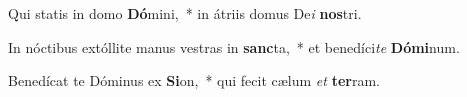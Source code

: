 \item Qui statis in domo \textbf{Dó}mini,~* in átriis domus De\textit{i} \textbf{nos}tri.
\item In nóctibus extóllite manus vestras in \textbf{sanc}ta,~* et benedíci\textit{te} \textbf{Dó}\textbf{mi}num.
\item Benedícat te Dóminus ex \textbf{Si}on,~* qui fecit cælum \textit{et} \textbf{ter}ram.
